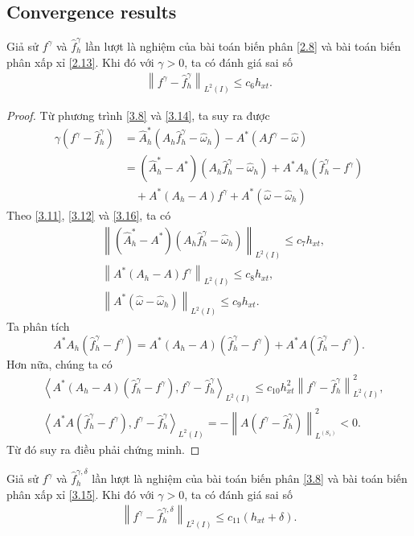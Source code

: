 \documentclass[]{article}
\begin{document}
\subsection{Convergence results}
\begin{dl}\label{dl3.3}
	Giả sử $f^\gamma$ và $\hat{f}^\gamma_h$ lần lượt là nghiệm của bài toán biến phân \eqref{2.8} và bài toán biến phân xấp xỉ \eqref{2.13}. Khi đó với $\gamma>0$, ta có đánh giá sai số
	\begin{align}\label{3.17}
	\left\|f^\gamma-\hat{f}^\gamma_h \right\|_{L^2(I)}\leq c_6h_{xt}.
	\end{align}
\end{dl}
\begin{proof} Từ phương trình \eqref{3.8} và \eqref{3.14}, ta suy ra được
	\begin{align*}
	\gamma \left(f^\gamma-\hat{f}^\gamma_h\right)&=\hat{A}^*_h\left(A_h\hat{f}^\gamma_h-\hat{\omega}_h\right)-A^*\left(Af^\gamma-\hat{\omega}\right)\\
	&=\left(\hat{A}^*_h-A^*\right)\left(A_h\hat{f}^\gamma_h-\hat{\omega}_h\right)+A^*A_h\left(\hat{f}^\gamma_h-f^\gamma\right)\\
	&\quad+A^*\left(A_h-A\right)f^\gamma+A^*\left(\hat{\omega}-\hat{\omega}_h\right)
	\end{align*}
	Theo \eqref{3.11}, \eqref{3.12} và \eqref{3.16}, ta có
	\begin{align*}
	&\left\| \left(\hat{A}^*_h-A^*\right)\left(A_h\hat{f}^\gamma_h-\hat{\omega}_h\right)\right\|_{L^2(I)}\leq c_7h_{xt},\\
	&\left\| A^*\left(A_h-A\right)f^\gamma\right\|_{L^2(I)}\leq c_8h_{xt},\\
	&\left\|A^*\left(\hat{\omega}-\hat{\omega}_h\right) \right\|_{L^2(I)}\leq c_9h_{xt}.
	\end{align*}
	Ta phân tích
	$$A^*A_h\left(\hat{f}^\gamma_h-f^\gamma\right)=A^*\left(A_h-A\right)\left(\hat{f}^\gamma_h-f^\gamma\right)+A^*A\left(\hat{f}^\gamma_h-f^\gamma\right).$$
	Hơn nữa, chúng ta có
	\begin{align*}
	&\left\langle A^*\left(A_h-A\right)\left(\hat{f}^\gamma_h-f^\gamma\right), f^\gamma-\hat{f}^\gamma_h\right\rangle_{L^2(I)}\leq c_{10}h_{xt}^2\left\| f^\gamma-\hat{f}^\gamma_h\right\|^2_{L^2(I)},\\
	&\left\langle A^*A\left(\hat{f}^\gamma_h-f^\gamma\right), f^\gamma-\hat{f}^\gamma_h\right\rangle_{L^2(I)}=-\left\|A\left(f^\gamma-\hat{f}^\gamma_h\right) \right\|^2_{L^(S_1)}<0.
	\end{align*}
	Từ đó suy ra điều phải chứng minh.
\end{proof}
\begin{cy}\label{cy3.1}
	Giả sử $f^\gamma$ và $\hat{f}^{\gamma, \delta}_h$ lần lượt là nghiệm của bài toán biến phân \eqref{3.8} và bài toán biến phân xấp xỉ \eqref{3.15}. Khi đó với $\gamma>0$, ta có đánh giá sai số
	\begin{align}\label{3.18}
	\left\|f^\gamma-\hat{f}^{\gamma, \delta}_h \right\|_{L^2(I)}\leq c_{11}(h_{xt}+\delta).
	\end{align}
\end{cy}
\end{document}
